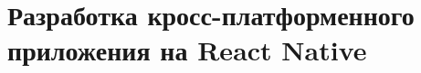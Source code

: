 \section{Разработка кросс-платформенного приложения на React Native}
\label{sec:section-2}



% 
% 
% 
% 
% 
% 